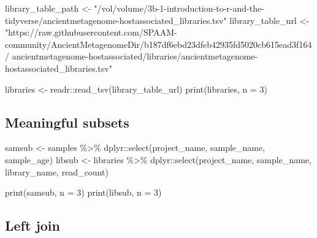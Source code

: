 \documentclass[
  letterpaper,
]{book}
\newenvironment{Shaded}{}{}
\newcommand{\AttributeTok}[1]{\textcolor[rgb]{0.84,0.23,0.29}{#1}}
\newcommand{\DecValTok}[1]{\textcolor[rgb]{0.00,0.36,0.77}{#1}}
\newcommand{\FunctionTok}[1]{\textcolor[rgb]{0.44,0.26,0.76}{#1}}
\newcommand{\NormalTok}[1]{\textcolor[rgb]{0.14,0.16,0.18}{#1}}
\newcommand{\OtherTok}[1]{\textcolor[rgb]{0.44,0.26,0.76}{#1}}
\newcommand{\SpecialCharTok}[1]{\textcolor[rgb]{0.00,0.36,0.77}{#1}}
\newcommand{\StringTok}[1]{\textcolor[rgb]{0.01,0.18,0.38}{#1}}
\begin{document}
\begin{Shaded}
\begin{Highlighting}[]
\NormalTok{library\_table\_path }\OtherTok{\textless{}{-}} \StringTok{"/vol/volume/3b{-}1{-}introduction{-}to{-}r{-}and{-}the{-}tidyverse/ancientmetagenome{-}hostassociated\_libraries.tsv"}
\NormalTok{library\_table\_url }\OtherTok{\textless{}{-}}
\StringTok{"https://raw.githubusercontent.com/SPAAM{-}community/AncientMetagenomeDir/b187df6ebd23dfeb42935fd5020cb615ead3f164/}
\StringTok{ancientmetagenome{-}hostassociated/libraries/ancientmetagenome{-}hostassociated\_libraries.tsv"}

\NormalTok{libraries }\OtherTok{\textless{}{-}}\NormalTok{ readr}\SpecialCharTok{::}\FunctionTok{read\_tsv}\NormalTok{(library\_table\_url)}
\FunctionTok{print}\NormalTok{(libraries, }\AttributeTok{n =} \DecValTok{3}\NormalTok{)}
\end{Highlighting}
\end{Shaded}

\hypertarget{meaningful-subsets}{%
\subsection{Meaningful subsets}\label{meaningful-subsets}}

\begin{Shaded}
\begin{Highlighting}[]
\NormalTok{samsub }\OtherTok{\textless{}{-}}\NormalTok{ samples }\SpecialCharTok{\%\textgreater{}\%}\NormalTok{ dplyr}\SpecialCharTok{::}\FunctionTok{select}\NormalTok{(project\_name, sample\_name, sample\_age)}
\NormalTok{libsub }\OtherTok{\textless{}{-}}\NormalTok{ libraries }\SpecialCharTok{\%\textgreater{}\%}\NormalTok{ dplyr}\SpecialCharTok{::}\FunctionTok{select}\NormalTok{(project\_name, sample\_name, library\_name, read\_count)}
\end{Highlighting}
\end{Shaded}

\begin{Shaded}
\begin{Highlighting}[]
\FunctionTok{print}\NormalTok{(samsub, }\AttributeTok{n =} \DecValTok{3}\NormalTok{)}
\FunctionTok{print}\NormalTok{(libsub, }\AttributeTok{n =} \DecValTok{3}\NormalTok{)}
\end{Highlighting}
\end{Shaded}

\hypertarget{left-join}{%
\subsection{Left join}\label{left-join}}
\end{document}
